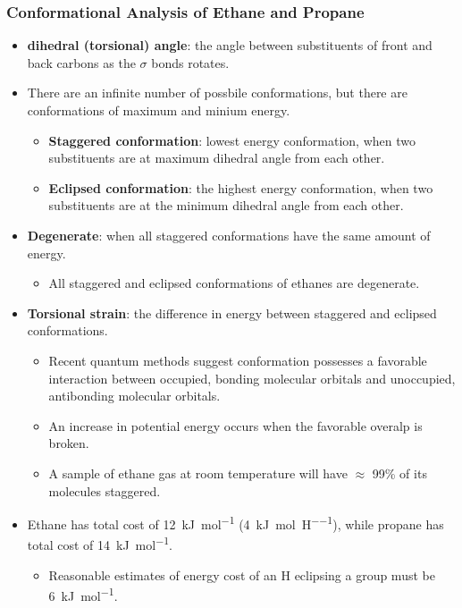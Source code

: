\documentclass[12pt,a4paper]{article}
\begin{document}
\begin{itemize}
    \subsubsection{Conformational Analysis of Ethane and Propane}
    \begin{itemize}
        \item \textbf{dihedral (torsional) angle}: the angle between substituents of front and back carbons as the $\sigma$ bonds rotates.
        \item There are an infinite number of possbile conformations, but there are conformations of maximum and minium energy.
            \begin{itemize}
                \item \textbf{Staggered conformation}: {\color{o-Sun}lowest energy} conformation, when two substituents are at maximum dihedral angle from each other.
                \item \textbf{Eclipsed conformation}: the {\color{o-Sun}highest energy} conformation, when two substituents are at the minimum dihedral angle from each other.
            \end{itemize}
        \item \textbf{Degenerate}: when all staggered conformations have the same amount of energy.
            \begin{itemize}
                \item All staggered and eclipsed conformations of ethanes are degenerate.
            \end{itemize}
        \item \textbf{Torsional strain}: the difference in energy between staggered and eclipsed conformations.
            \begin{itemize}
                \item Recent quantum methods suggest conformation possesses a favorable interaction between occupied, bonding molecular orbitals and unoccupied, antibonding molecular orbitals.
                \item An increase in potential energy occurs when the favorable overalp is broken.
                \item A sample of ethane gas at room temperature will have \(\approx\) 99\% of its molecules staggered.
            \end{itemize}
        \item Ethane has total cost of \SI{12}{kJ\per\mole} (\SI{4}{kJ\per\mole\per H}), while propane has total cost of \SI{14}{kJ\per\mole}.
            \begin{itemize}
                \item Reasonable estimates of energy cost of an H eclipsing a  group must be \SI{6}{kJ\per\mole}.
            \end{itemize}
    \end{itemize}

\end{itemize}
\end{document}
